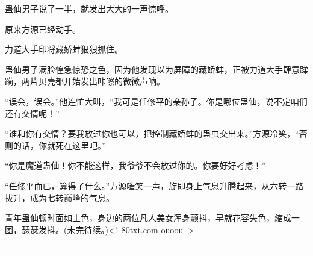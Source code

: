 \begin{this_body}
蛊仙男子说了一半，就发出大大的一声惊呼。

原来方源已经动手。

力道大手印将藏娇蚌狠狠抓住。

蛊仙男子满脸惶急惊恐之色，因为他发现以为屏障的藏娇蚌，正被力道大手肆意蹂躏，两片贝壳都开始发出咔嚓的微微声响。

“误会，误会。”他连忙大叫，“我可是任修平的亲孙子。你是哪位蛊仙，说不定咱们还有交情呢！”

“谁和你有交情？要我放过你也可以，把控制藏娇蚌的蛊虫交出来。”方源冷笑，“否则的话，你就死在这里吧。”

“你是魔道蛊仙！你不能这样，我爷爷不会放过你的。你要好好考虑！”

“任修平而已，算得了什么。”方源嗤笑一声，旋即身上气息升腾起来，从六转一路拔升，成为七转巅峰的气息。

青年蛊仙顿时面如土色，身边的两位凡人美女浑身颤抖，早就花容失色，缩成一团，瑟瑟发抖。(未完待续。)<!--80txt.com-ouoou-->

------------

\end{this_body}

